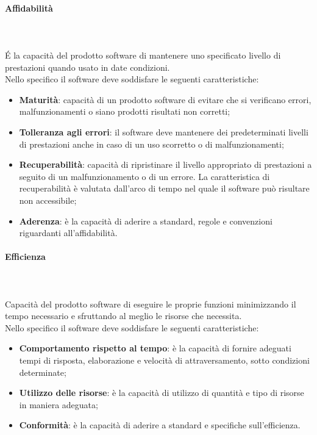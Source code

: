 \paragraph{Affidabilità}\mbox{} \\ \mbox{} \\
\'E la capacità del prodotto software di mantenere uno specificato livello di prestazioni quando usato in date condizioni. \\
Nello specifico il software deve soddisfare le seguenti caratteristiche:
\begin{itemize}
	\item \textbf{Maturità}: capacità di un prodotto software di evitare che si verificano errori, malfunzionamenti o siano prodotti risultati non corretti;
	\item \textbf{Tolleranza agli errori}: il software deve mantenere dei predeterminati livelli di prestazioni anche in caso di un uso scorretto o di malfunzionamenti;
	\item \textbf{Recuperabilità}: capacità di ripristinare il livello appropriato di prestazioni a seguito di un malfunzionamento o di un errore. La caratteristica di recuperabilità è valutata dall'arco di tempo nel quale il software può risultare non accessibile;
	\item \textbf{Aderenza}: è la capacità di aderire a standard, regole e convenzioni riguardanti all'affidabilità.
\end{itemize}
\paragraph{Efficienza}\mbox{} \\ \mbox{} \\
Capacità del prodotto software di eseguire le proprie funzioni minimizzando il tempo necessario e sfruttando al meglio le risorse che necessita. \\
Nello specifico il software deve soddisfare le seguenti caratteristiche:
\begin{itemize}
	\item \textbf{Comportamento rispetto al tempo}: è la capacità di fornire adeguati tempi di risposta, elaborazione e velocità di attraversamento, sotto condizioni determinate;
	\item \textbf{Utilizzo delle risorse}: è la capacità di utilizzo di quantità e tipo di risorse in maniera adeguata;
	\item \textbf{Conformità}: è la capacità di aderire a standard e specifiche sull'efficienza.
\end{itemize}
